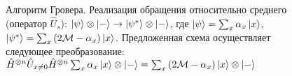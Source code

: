 \begin{figure}
\centering



\caption{Алгоритм Гровера. Реализация обращения относительно
  среднего (оператор $\hat{U}_s$): $\left|\psi\right>\otimes\ket{-} \rightarrow
  \left|\psi^{\ast}\right>\otimes\ket{-}$, где
$\left|\psi\right> = \sum_x \alpha_x \ket{ x }$, 
$\left|\psi^{\ast}\right> = \sum_x \left( 2 \mathcal{M} -  \alpha_x \right)
  \ket{ x }$. 
Предложенная схема осуществляет следующее преобразование: 
$\hat{H}^{\otimes n}\hat{U}_{x \ne 0}\hat{H}^{\otimes n} \sum_x
  \alpha_x \ket{ x } \otimes \left| - \right > = 
\sum_x \left( 2 \mathcal{M} -  \alpha_x \right) \ket{ x }
\otimes \left| - \right >
$
} 
\label{figQuantCompGroverMeanInvImpl}
\end{figure}
